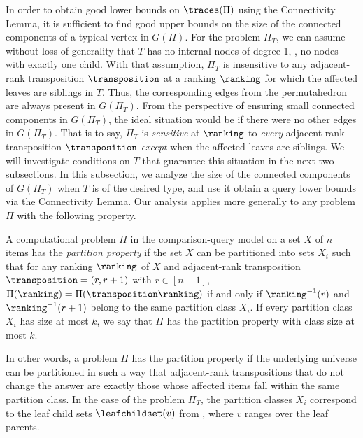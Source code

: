 In order to obtain good lower bounds on $\traces(\Pi)$ using the Connectivity Lemma, it is sufficient to find good upper bounds on the size of the connected components of a typical vertex in $G(\Pi)$. For the problem $\Pi_T$, we can assume without loss of generality that $T$ has no internal nodes of degree 1, \ie, no nodes with exactly one child. With that assumption, $\Pi_T$ is insensitive to any adjacent-rank transposition $\transposition$ at a ranking $\ranking$ for which the affected leaves are siblings in $T$. Thus, the corresponding edges from the permutahedron are always present in $G(\Pi_T)$. From the perspective of ensuring small connected components in $G(\Pi_T)$, the ideal situation would be if there were no other edges in $G(\Pi_T)$. That is to say, $\Pi_T$ is \emph{sensitive} at $\ranking$ to \emph{every} adjacent-rank transposition $\transposition$ \emph{except} when the affected leaves are siblings. We will investigate conditions on $T$ that guarantee this situation in the next two subsections. In this subsection, we analyze the size of the connected components of $G(\Pi_T)$ when $T$ is of the desired type, and use it obtain a query lower bounds via the Connectivity Lemma. Our analysis applies more generally to any problem $\Pi$ with the following property.
\begin{definition}\label{def:partition-property}
A computational problem $\Pi$ in the comparison-query model on a set $X$ of $n$ items has the \emph{partition property} if the set $X$ can be partitioned into sets $X_i$ such that for any ranking $\ranking$ of $X$ and adjacent-rank transposition $\transposition = (r, r+1)$ with $r \in [n-1]$, $\Pi(\ranking) = \Pi(\transposition \ranking)$ if and only if $\ranking^{-1}(r)$ and $\ranking^{-1}(r+1)$ belong to the same partition class $X_i$. If every partition class $X_i$ has size at most $k$, we say that $\Pi$ has the partition property with class size at most $k$.
\end{definition}
In other words, a problem $\Pi$ has the partition property if the underlying universe can be partitioned in such a way that 
adjacent-rank transpositions that do not change the answer are exactly those whose affected items fall within the same partition class. In the case of the problem $\Pi_T$, the partition classes $X_i$ correspond to the leaf child sets $\leafchildset(v)$ from , where $v$ ranges over the leaf parents.

